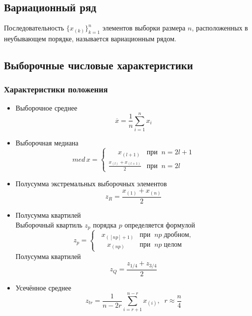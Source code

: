\documentclass[a4paper]{article}
\begin{document}
	\subsection{Вариационный ряд}
Последовательность $\displaystyle\{x_{(k)}\}_{k=1}^n$ элементов выборки размера $n$, расположенных в неубывающем порядке, называется вариационным рядом.
\subsection{Выборочные числовые характеристики}
\subsubsection{Характеристики положения}
\begin{itemize}
    \item Выборочное среднее
    \begin{equation}\label{mean}
        \overline{x}=\frac{1}{n}\sum_{i=1}^n x_i
    \end{equation}
    \item Выборочная медиана
    \begin{equation}\label{med}
        med\,x = \begin{cases}
        \displaystyle\;\;\;\;\;x_{(l+1)}&\text{при}\;\;n=2l+1\\
        \displaystyle\frac{x_{(l)}+x_{(l+1)}}{2}&\text{при}\;\;n=2l
        \end{cases}
    \end{equation}
    \item Полусумма экстремальных выборочных элементов
    \begin{equation}\label{exhfsum}
        z_R=\frac{x_{(1)}+x_{(n)}}{2}
    \end{equation}
    \item Полусумма квартилей\\
    Выборочный квартиль $z_p$ порядка $p$ определяется формулой
    \begin{equation}
        z_p = \begin{cases}\label{pqv}
        \displaystyle\;\;x_{([np]+1)}&\text{при}\;\;np\;\text{дробном,}\\
        \displaystyle\;\;\;\;\;x_{(np)}&\text{при}\;\;np\;\text{целом}
        \end{cases}
    \end{equation}
    Полусумма квартилей
    \begin{equation}\label{eq:hfsum}
        z_Q=\frac{z_{1/4}+z_{3/4}}{2}
    \end{equation}
    \item Усечённое среднее
    \begin{equation}\label{eq:trmean}
        z_{tr}=\frac{1}{n-2r}\sum_{i=r+1}^{n-r}x_{(i)},\;\;r\approx\frac{n}{4}
    \end{equation}
\end{itemize}
\end{document}
